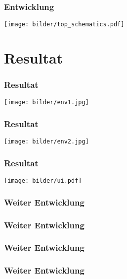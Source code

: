 \begin{frame}
	\frametitle{Entwicklung}
		\centering
		\texttt{[image: bilder/top\_schematics.pdf]}
	
\end{frame}

\section{Resultat}

\begin{frame}
	\frametitle{Resultat}
	\centering
	\texttt{[image: bilder/env1.jpg]}	
\end{frame}

\begin{frame}
\frametitle{Resultat}
\centering
\texttt{[image: bilder/env2.jpg]}	
\end{frame}

\begin{frame}
\frametitle{Resultat}
\centering
\texttt{[image: bilder/ui.pdf]}	
\end{frame}

\begin{frame}
\frametitle{Weiter Entwicklung}
\centering
\setlength{\fboxsep}{0.5pt}
\setlength{\fboxrule}{0.5pt}
\end{frame}

\begin{frame}
\frametitle{Weiter Entwicklung}
\centering
\setlength{\fboxsep}{0.5pt}
\setlength{\fboxrule}{0.5pt}
\end{frame}

\begin{frame}
\frametitle{Weiter Entwicklung}
\centering
\setlength{\fboxsep}{0.5pt}
\setlength{\fboxrule}{0.5pt}
\end{frame}

\begin{frame}
\frametitle{Weiter Entwicklung}
\centering
\setlength{\fboxsep}{0.5pt}
\setlength{\fboxrule}{0.5pt}
\end{frame}